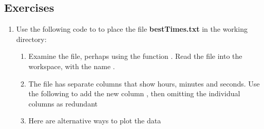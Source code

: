 \subsection{Exercises}\label{ss:ch2ex}

\begin{enumerate}
\item Use the following code to to place the file 
\textbf{bestTimes.txt} in the working directory:

\begin{enumerate}
\item  Examine the file, perhaps using the function .
Read the file into the workspace, with the name .
\begin{knitrout}
\color{fgcolor}\begin{kframe}
\begin{alltt}
 \hlkwb{<-} \hlstd{(}\hlstd{)}
\end{alltt}
\end{kframe}
\end{knitrout}
\item The  file has separate columns that show hours,
  minutes and seconds.  Use the following to add the new column
  , then omitting the individual columns as redundant
\begin{knitrout}
\color{fgcolor}\begin{kframe}
\begin{alltt}
\hlopt{$} \hlkwb{<-} 
                       \hlopt{*} \hlopt{+}  \hlopt{+} \hlopt{/}\hlstd{)}
\hlstd{(bestTimes)[}\hlopt{:}\hlstd{]}   
 \hlkwb{<-} \hlstd{bestTimes[,} \hlopt{-}\hlstd{(}\hlopt{:}\hlstd{)]}
\end{alltt}
\end{kframe}
\end{knitrout}
\item Here are alternative ways to plot the data
\begin{knitrout}
\color{fgcolor}\begin{kframe}

\end{kframe}
\end{knitrout}
\end{enumerate}
\end{enumerate}
